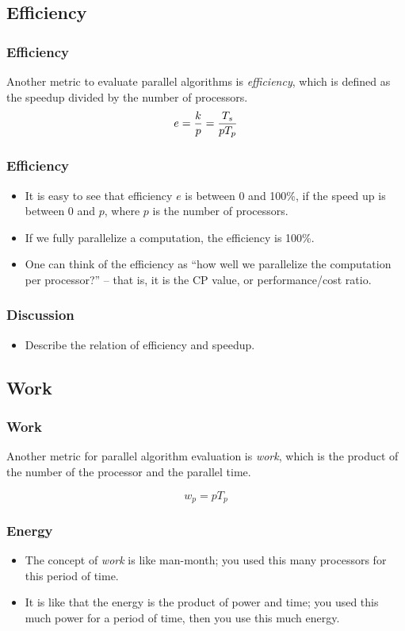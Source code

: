 \documentclass{beamer}
\begin{document}
\begin{CJK}{UTF8}{bsmi}
\subsection{Efficiency}

\begin{frame}
\frametitle{Efficiency} Another metric to evaluate parallel algorithms
is {\em efficiency}, which is defined as the speedup divided by the
number of processors.
\begin{equation}
e = {k \over p} =  {T_s \over {p T_p}}
\end{equation}
\end{frame}

\begin{frame}
\frametitle{Efficiency}
\begin{itemize}
\item It is easy to see that efficiency $e$ is between 0 and 100\%, if
  the speed up is between 0 and $p$, where $p$ is the number of
  processors.
\item If we fully parallelize a computation, the efficiency is 100\%.
\item One can think of the efficiency as ``how well we parallelize the
  computation per processor?'' -- that is, it is the CP value, or
  performance/cost ratio.
\end{itemize}
\end{frame}

\begin{frame}
\frametitle{Discussion}
\begin{itemize}
\item Describe the relation of efficiency and speedup.
\end{itemize}
\end{frame}

\subsection{Work}

\begin{frame}
\frametitle{Work} 

Another metric for parallel algorithm evaluation is {\em work}, which
is the product of the number of the processor and the parallel time.

\begin{equation}
w_p = p T_p
\end{equation}
\end{frame}

\begin{frame}
\frametitle{Energy}
\begin{itemize}
\item The concept of {\em work} is like man-month; you used this many
  processors for this period of time.
\item It is like that the energy is the product of power and time; you
  used this much power for a period of time, then you use this much
  energy.
\end{itemize}
\end{frame}


\end{CJK}
\end{document}
